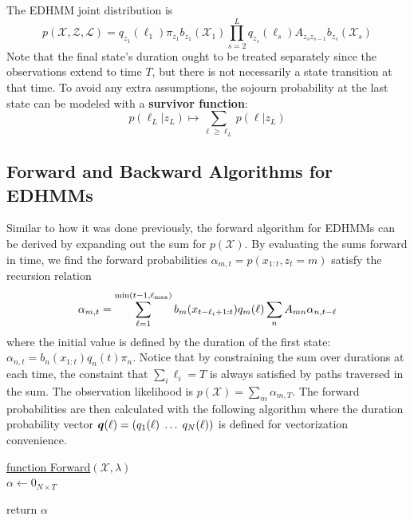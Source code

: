 \documentclass[onecolumn]{gwclass}
\begin{document}
	The EDHMM joint distribution is
	$$ p(\mathcal{X},\mathcal{Z},\mathcal{L}) = q_{z_1}(\ell_1)\pi_{z_1}  b_{z_1}(\mathcal{X}_1)\prod_{s=2}^L q_{z_s}(\ell_s) A_{z_sz_{s-1}} b_{z_s}(\mathcal{X}_s) $$
	Note that the final state's duration ought to be treated separately since the observations extend to time $T$, but there is not necessarily a state transition at that time. To avoid any extra assumptions, the sojourn probability at the last state can be modeled with a \textbf{survivor function}: 
	$$ p(\ell_L|z_L) \mapsto \sum_{\ell\geq \ell_L} p(\ell|z_L) $$
	
	\subsection{Forward and Backward Algorithms for EDHMMs}
	Similar to how it was done previously, the forward algorithm for EDHMMs can be derived by expanding out the sum for $p(\mathcal{X})$. By evaluating the sums forward in time, we find the forward probabilities $\alpha_{m,t}=p(x_{1:t}, z_t=m)$ satisfy the recursion relation
	$$ \alpha_{m,t} = \sum_{\ell=1}^{\min(t-1, \ell_{\text{\normalfont{max}}})} b_m(x_{t-\ell_i+1:t}) q_m(\ell)\sum_n A_{mn} \alpha_{n,t-\ell} $$
	where the initial value is defined by the duration of the first state: $\alpha_{n,t}=b_n(x_{1:t})q_n(t)\pi_n$. Notice that by constraining the sum over durations at each time, the constaint that $\sum_i\ell_i=T$ is always satisfied by paths traversed in the sum. The observation likelihood is $p(\mathcal{X})=\sum_m\alpha_{m,T}$. The forward probabilities are then calculated with the following algorithm where the duration probability vector $\boldsymbol{q}(\ell) = (q_1(\ell) \;\dots\;q_N(\ell))$ is defined for vectorization convenience.
	
	\begin{algorithm}
	\caption{EDHMM Forward Algorithm --- Vectors}
	
	\underline{function Forward}$(\mathcal{X},\lambda)$\\
	$\alpha \leftarrow 0_{N\times T}$
	
	
	
	return $\alpha$
	\end{algorithm}
\end{document}
